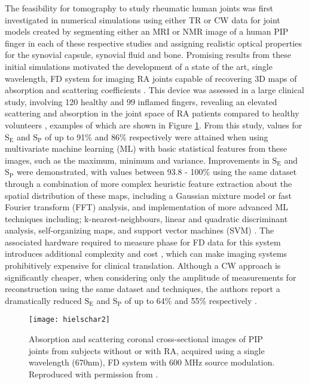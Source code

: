 \documentclass[twoside]{bhamthesis}
\theoremstyle{definition}
\begin{document}
The feasibility for tomography to study rheumatic human joints was first investigated in numerical simulations using either TR \cite{klose1998} or CW \cite{netz2001imaging} data for joint models created by segmenting either an MRI or NMR image of a human PIP finger in each of these respective studies and assigning realistic optical properties for the synovial capsule, synovial fluid and bone. Promising results from these initial simulations motivated the development of a state of the art, single wavelength, FD system for imaging RA joints capable of recovering 3D maps of absorption and scattering coefficients \cite{hielscher2004sagittal,netz2008multipixel}. This device was assessed in a large clinical study, involving 120 healthy and 99 inflamed fingers, revealing an elevated scattering and absorption in the joint space of RA patients compared to healthy volunteers \cite{hielscher2011frequency}, examples of which are shown in Figure \ref{fig:Hielschar_results}. From this study, values for $\mathrm{S_E}$ and $\mathrm{S_P}$ of up to 91\% and 86\% respectively were attained when using multivariate machine learning (ML) with basic statistical features from these images, such as the maximum, minimum and variance. Improvements in $\mathrm{S_E}$ and $\mathrm{S_P}$ were demonstrated, with values between 93.8 - 100\% \cite{montejo2013computer2} using the same dataset through a combination of more complex heuristic feature extraction about the spatial distribution of these maps, including a Gaussian mixture model or fast Fourier transform (FFT) analysis, and implementation of more advanced ML techniques including; k-nearest-neighbours, linear and quadratic discriminant analysis, self-organizing maps, and support vector machines (SVM) \cite{montejo2013computer}. The associated hardware required to measure phase for FD data for this system introduces additional complexity and cost \cite{netz2008multipixel}, which can make imaging systems prohibitively expensive for clinical translation. Although a CW approach is significantly cheaper, when considering only the amplitude of measurements for reconstruction using the same dataset and techniques, the authors report a dramatically reduced $\mathrm{S_E}$ and $\mathrm{S_P}$ of up to 64\% and 55\% respectively \cite{montejo2013computer2}.

\begin{figure}[!ht]
\texttt{[image: hielschar2]}
\centering
\caption{Absorption and scattering coronal cross-sectional images of PIP joints from subjects without or with RA, acquired using a single wavelength (670nm), FD system with 600 MHz source modulation. Reproduced with permission from \cite{hielscher2011frequency}.}
\centering
\label{fig:Hielschar_results}
\end{figure} 
\end{document}
